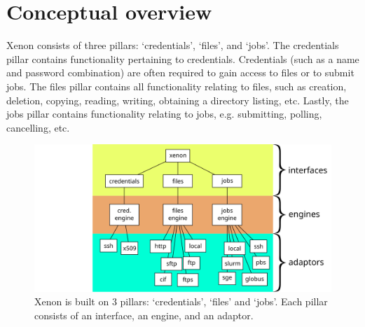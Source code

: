 \section{Conceptual overview}





Xenon consists of three pillars: `credentials', `files', and `jobs'.
%
The credentials pillar contains functionality pertaining to credentials. Credentials (such as a name and password combination) are often required to gain access to files or to submit jobs.
%
The files pillar contains all functionality relating to files, such as creation, deletion, copying, reading, writing, obtaining a directory listing, etc.
%
Lastly, the jobs pillar contains functionality relating to jobs, e.g. submitting, polling, cancelling, etc.


\begin{figure}[ht]
\centering
\includegraphics[width=1.0\columnwidth]{images/xenon-design}
\caption{\label{fig:xenon-design} Xenon is built on 3 pillars: `credentials', `files' and `jobs'. Each pillar consists of an interface, an engine, and an adaptor.}
\end{figure}
